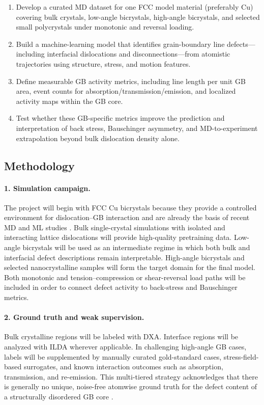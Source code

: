 \begin{enumerate}
    \item Develop a curated MD dataset for one FCC model material (preferably Cu) covering bulk crystals, low-angle bicrystals, high-angle bicrystals, and selected small polycrystals under monotonic and reversal loading.
    \item Build a machine-learning model that identifies grain-boundary line defects---including interfacial dislocations and disconnections---from atomistic trajectories using structure, stress, and motion features.
    \item Define measurable GB activity metrics, including line length per unit GB area, event counts for absorption/transmission/emission, and localized activity maps within the GB core.
    \item Test whether these GB-specific metrics improve the prediction and interpretation of back stress, Bauschinger asymmetry, and MD-to-experiment extrapolation beyond bulk dislocation density alone.
\end{enumerate}

\subsection*{Methodology}
\paragraph{1. Simulation campaign.}
The project will begin with FCC Cu bicrystals because they provide a controlled environment for dislocation--GB interaction and are already the basis of recent MD and ML studies \cite{Noh2024,DGI2025}. Bulk single-crystal simulations with isolated and interacting lattice dislocations will provide high-quality pretraining data. Low-angle bicrystals will be used as an intermediate regime in which both bulk and interfacial defect descriptions remain interpretable. High-angle bicrystals and selected nanocrystalline samples will form the target domain for the final model. Both monotonic and tension--compression or shear-reversal load paths will be included in order to connect defect activity to back-stress and Bauschinger metrics.

\paragraph{2. Ground truth and weak supervision.}
Bulk crystalline regions will be labeled with DXA. Interface regions will be analyzed with ILDA wherever applicable. In challenging high-angle GB cases, labels will be supplemented by manually curated gold-standard cases, stress-field-based surrogates, and known interaction outcomes such as absorption, transmission, and re-emission. This multi-tiered strategy acknowledges that there is generally no unique, noise-free atomwise ground truth for the defect content of a structurally disordered GB core \cite{OVITODXA,Deka2023}.

